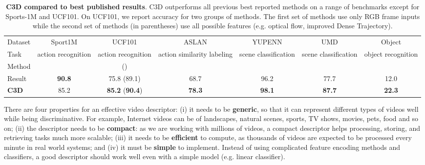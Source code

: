 \documentclass[10pt,twocolumn,letterpaper]{article}
\begin{document}
\begin{table*}
\begin{center}
{\small
\begin{tabular}{|l|c|c|c|c|c|c|}
\hline
Dataset & Sport1M & UCF101 & ASLAN & YUPENN & UMD & Object \\
Task & {\footnotesize action recognition} & {\footnotesize action recognition} & {\footnotesize action similarity labeling} & {\footnotesize scene classification} & {\footnotesize scene classification} & {\footnotesize object recognition} \\ 
\hline
Method & \cite{Ng15} & \cite{SrivastavaMS15}(\cite{LanLLHR14}) & \cite{PengWWQ14} & \cite{FeichtenhoferPW14} & \cite{FeichtenhoferPW14} & \cite{Ren2009}\\
Result & {\bf 90.8} & 75.8 (89.1) & 68.7 & 96.2 & 77.7 & 12.0 \\
{\bf C3D} & 85.2 & {\bf 85.2} ({\bf 90.4}) & {\bf 78.3} & {\bf 98.1} & {\bf 87.7} & {\bf 22.3}\\
\hline
\end{tabular}
}
\end{center}
\vspace{-6pt}
\caption{{\bf C3D compared to best published results}. C3D outperforms all previous best reported methods on a range of benchmarks except for Sports-1M and UCF101. On UCF101, we report accuracy for two groups of methods. The first set of methods use only RGB frame inputs while the second set of methods (in parentheses) use all possible features (e.g. optical flow, improved Dense Trajectory).} \label{tab:summary_result}
\vspace{-6pt}
\end{table*}


There are four properties for an effective video descriptor: (i) it needs to be {\bf generic}, so that it can represent different types of videos well while being discriminative. For example, Internet videos can be of landscapes, natural scenes, sports, TV shows, movies, pets, food and so on; (ii) the descriptor needs to be {\bf compact}: as we are working with millions of videos, a compact descriptor helps processing, storing, and retrieving tasks much more scalable; (iii) it needs to be {\bf efficient} to compute, as thousands of videos are expected to be processed every minute in real world systems; and (iv) it must be {\bf simple} to implement. Instead of using complicated feature encoding methods and classifiers, a good descriptor should work well even with a simple model (e.g. linear classifier).
\end{document}

